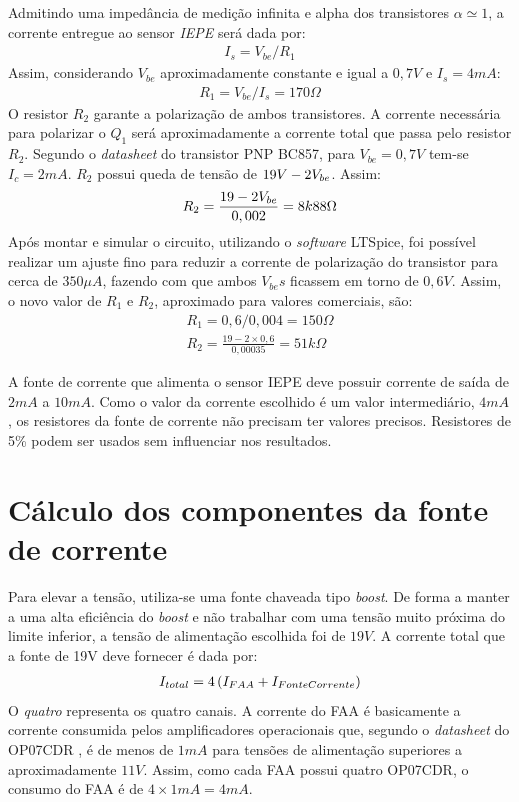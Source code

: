 \documentclass[
	12pt,				%
	openright,			%
	twoside,			%
	a4paper,			%
	english,			%
	french,				%
	spanish,			%
	brazil,				%
	]{abntex2}
\begin{document}
\begin{apendicesenv}
	Admitindo uma impedância de medição infinita e alpha dos transistores
	$\alpha\simeq1$, a corrente entregue ao sensor \textit{IEPE} será dada por:
	\begin{gather*}
		I_s = V_{be}/R_1
	\end{gather*}
	Assim, considerando $V_{be}$ aproximadamente constante e igual a $0,7V$ e
	$I_s = 4mA$:
	\begin{gather*}
		R_1 = V_{be}/I_s = 170\Omega
	\end{gather*}
	O resistor $R_2$ garante a polarização de ambos transistores. A
	corrente necessária para polarizar o $Q_1$ será aproximadamente a
	corrente total que passa pelo resistor $R_2$. Segundo o
	\textit{datasheet} do transistor PNP BC857, para $V_{be} = 0,7V$
	tem-se $I_c = 2mA$. $R_2$ possui queda de tensão de $19V -
	2\*V_{be}$. Assim:
	\begin{gather*}
		R_2 = \frac{19 - 2\*V_{be}}{0,002} = 8k88\Omega
	\end{gather*}
	Após montar e simular o circuito, utilizando o \textit{software}
	LTSpice, foi possível realizar um ajuste fino para reduzir a
	corrente de polarização do transistor para cerca de $350\mu A$,
	fazendo com que ambos $V_{be}s$ ficassem em torno de $0,6V$. Assim,
	o novo valor de $R_1$ e $R_2$, aproximado para valores comerciais,
	são:
	\begin{gather*}
		R_1 = 0,6/0,004 = 150\Omega\\
		R_2 = \frac{19-2\times 0,6}{0,00035} = 51k\Omega
	\end{gather*}

	A fonte de corrente que alimenta o sensor IEPE deve possuir
	corrente de saída de $2mA$ a $10mA$. Como o valor da corrente
	escolhido é um valor intermediário, $4mA$, os resistores da
	fonte de corrente não precisam ter valores precisos. Resistores
	de 5\% podem ser usados sem influenciar nos resultados.

\chapter{Cálculo dos componentes da fonte de corrente}
\label{ape:calculoBoost}

	Para elevar a tensão, utiliza-se uma fonte chaveada tipo
	\textit{boost}. De forma a manter a uma alta eficiência do
	\textit{boost} e não trabalhar com uma tensão muito próxima do
	limite inferior, a tensão de alimentação escolhida foi de $19V$.
	A corrente total que a fonte de 19V deve fornecer é dada por:
	\begin{gather*}
		I_{total} = 4\* \left(I_{FAA} + I_{FonteCorrente}\right)
	\end{gather*}
	O \textit{quatro} representa os quatro canais. A corrente do FAA
	é basicamente a corrente consumida pelos amplificadores
	operacionais que, segundo o \textit{datasheet} do OP07CDR \cite{op07c}, é de
	menos de $1mA$ para tensões de alimentação superiores a
	aproximadamente $11V$. Assim, como cada FAA possui quatro OP07CDR,
	o consumo do FAA é de $4\times 1mA =  4mA$.


\end{apendicesenv}
\end{document}
